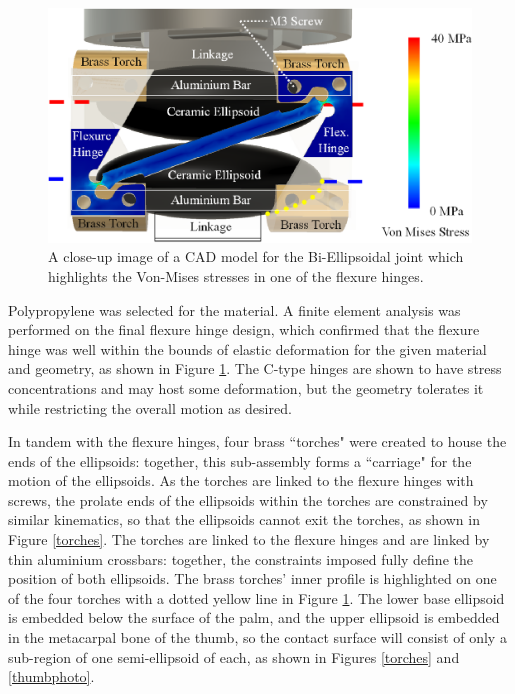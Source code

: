 \documentclass[journal]{IEEEtran}
\begin{document}
\begin{figure}
	\centering
	\includegraphics[width = 1\columnwidth]{figures/vonmises2.eps}
	\caption{A close-up image of a CAD model for the Bi-Ellipsoidal joint which highlights the Von-Mises stresses in one of the flexure hinges.}\label{torches}
 \label{vonmises}
\end{figure}

Polypropylene was selected for the material. A finite element analysis was performed on the final flexure hinge design, which confirmed that the flexure hinge was well within the bounds of elastic deformation for the given material and geometry, as shown in Figure \ref{vonmises}. The C-type hinges are shown to have stress concentrations and may host some deformation, but the geometry tolerates it while restricting the overall motion as desired. 

 In tandem with the flexure hinges, four brass ``torches" were created to house the ends of the ellipsoids: together, this sub-assembly forms a ``carriage" for the motion of the ellipsoids. As the torches are linked to the flexure hinges with screws, the prolate ends of the ellipsoids within the torches are constrained by similar kinematics, so that the ellipsoids cannot exit the torches, as shown in Figure \ref{torches}. The torches are linked to the flexure hinges and are linked by thin aluminium crossbars: together, the constraints imposed fully define the position of both ellipsoids. The brass torches' inner profile is highlighted on one of the four torches with a dotted yellow line in Figure \ref{vonmises}. The lower base ellipsoid is embedded below the surface of the palm, and the upper ellipsoid is embedded in the metacarpal bone of the thumb, so the contact surface will consist of only a sub-region of one semi-ellipsoid of each, as shown in Figures \ref{torches} and \ref{thumbphoto}. 
\end{document}

